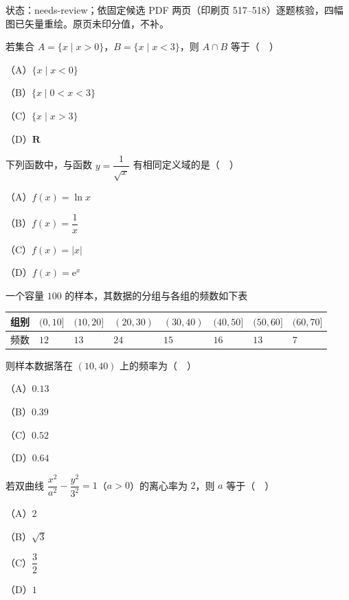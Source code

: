 

状态：needs-review；依固定候选 PDF 两页（印刷页 517–518）逐题核验，四幅图已矢量重绘。原页未印分值，不补。


\begin{question}
若集合 $A=\{x\mid x>0\}$，$B=\{x\mid x<3\}$，则 $A\cap B$ 等于（　）

（A）$\{x\mid x<0\}$

（B）$\{x\mid 0<x<3\}$

（C）$\{x\mid x>3\}$

（D）$\mathbf R$

\end{question}
\begin{question}
下列函数中，与函数 $y=\dfrac1{\sqrt x}$ 有相同定义域的是（　）

（A）$f(x)=\ln x$

（B）$f(x)=\dfrac1x$

（C）$f(x)=|x|$

（D）$f(x)=\mathrm e^x$

\end{question}
\begin{question}
一个容量 $100$ 的样本，其数据的分组与各组的频数如下表

\begin{center}
\begingroup\setlength{\tabcolsep}{4pt}
\begin{tabular}{llllllll}
\toprule
组别 & $(0,10]$ & $(10,20]$ & $(20,30)$ & $(30,40)$ & $(40,50]$ & $(50,60]$ & $(60,70]$ \\
\midrule
频数 & $12$ & $13$ & $24$ & $15$ & $16$ & $13$ & $7$ \\
\bottomrule
\end{tabular}
\endgroup
\end{center}

则样本数据落在 $(10,40)$ 上的频率为（　）

（A）$0.13$

（B）$0.39$

（C）$0.52$

（D）$0.64$

\end{question}
\begin{question}
若双曲线 $\dfrac{x^2}{a^2}-\dfrac{y^2}{3^2}=1$（$a>0$）的离心率为 $2$，则 $a$ 等于（　）

（A）$2$

（B）$\sqrt3$

（C）$\dfrac32$

（D）$1$

\Needspace{0.4\textheight}
\end{question}
